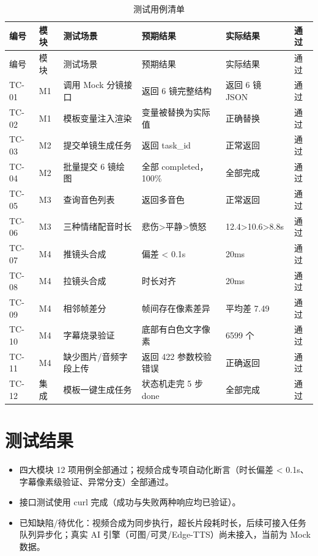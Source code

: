 \documentclass[12pt]{ctexrep}
\begin{document}
\begin{longtable}{p{1.6cm}p{1.4cm}p{4.4cm}p{4.4cm}p{2.4cm}p{1.2cm}}
\caption{测试用例清单}\label{tab:cases}\\
\toprule
编号 & 模块 & 测试场景 & 预期结果 & 实际结果 & 通过\\
\midrule
\endfirsthead
\toprule
编号 & 模块 & 测试场景 & 预期结果 & 实际结果 & 通过\\
\midrule
\endhead
TC-01 & M1 & 调用 Mock 分镜接口 & 返回 6 镜完整结构 & 返回 6 镜 JSON & 通过\\
TC-02 & M1 & 模板变量注入渲染 & 变量被替换为实际值 & 正确替换 & 通过\\
TC-03 & M2 & 提交单镜生成任务 & 返回 task\_id & 正常返回 & 通过\\
TC-04 & M2 & 批量提交 6 镜绘图 & 全部 completed，100\% & 全部完成 & 通过\\
TC-05 & M3 & 查询音色列表 & 返回多音色 & 正常返回 & 通过\\
TC-06 & M3 & 三种情绪配音时长 & 悲伤>平静>愤怒 & 12.4>10.6>8.8s & 通过\\
TC-07 & M4 & 推镜头合成 & 偏差 < 0.1s & 20ms & 通过\\
TC-08 & M4 & 拉镜头合成 & 时长对齐 & 20ms & 通过\\
TC-09 & M4 & 相邻帧差分 & 帧间存在像素差异 & 平均差 7.49 & 通过\\
TC-10 & M4 & 字幕烧录验证 & 底部有白色文字像素 & 6599 个 & 通过\\
TC-11 & M4 & 缺少图片/音频字段上传 & 返回 422 参数校验错误 & 正确返回 & 通过\\
TC-12 & 集成 & 模板一键生成任务 & 状态机走完 5 步 done & 全部完成 & 通过\\
\bottomrule
\end{longtable}

\section{测试结果}

\begin{itemize}
\item 四大模块 12 项用例全部通过；视频合成专项自动化断言（时长偏差 < 0.1s、字幕像素级验证、异常分支）全部通过。
\item 接口测试使用 curl 完成（成功与失败两种响应均已验证）。
\item 已知缺陷/待优化：视频合成为同步执行，超长片段耗时长，后续可接入任务队列异步化；真实 AI 引擎（可图/可灵/Edge-TTS）尚未接入，当前为 Mock 数据。
\end{itemize}
\end{document}
